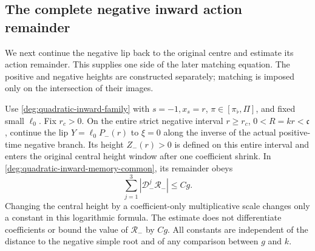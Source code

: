 \subsection{The complete negative inward action remainder}

We next continue the negative lip back to the original centre and
estimate its action remainder. This supplies one side of the later
matching equation. The positive and negative heights are constructed
separately; matching is imposed only on the intersection of their images.

\begin{corollary}\label{deg:cor-negative-inward-common-centre}
Use \eqref{deg:quadratic-inward-family} with \(s=-1,x_s=r\),
\(\pi\in[\pi_\flat,\Pi]\), and fixed small \(\ell_0\).
Fix \(r_c>0\). On the entire strict negative interval
\(r\ge r_c\), \(0<R=kr<\mathfrak c\), continue the lip
\(Y=\ell_0P_-(r)\) to \(\xi=0\) along the inverse of the actual
positive-time negative branch. Its height \(Z_-(r)>0\) is defined on
this entire interval and enters the original central height window
after one coefficient shrink. In \eqref{deg:quadratic-inward-memory-common}, its remainder obeys
\begin{equation}\label{deg:negative-inward-central-remainder}
 \sum_{j=1}^3|\mathcal D_-^j\mathcal R_-|\le Cg.
\end{equation}
Changing the central height by a coefficient-only multiplicative scale changes
only a constant in this logarithmic formula. The estimate does not
differentiate coefficients or bound the value of \(\mathcal R_-\) by
\(Cg\). All constants are independent of the distance to the negative
simple root and of any comparison between \(g\) and \(k\).
\end{corollary}

